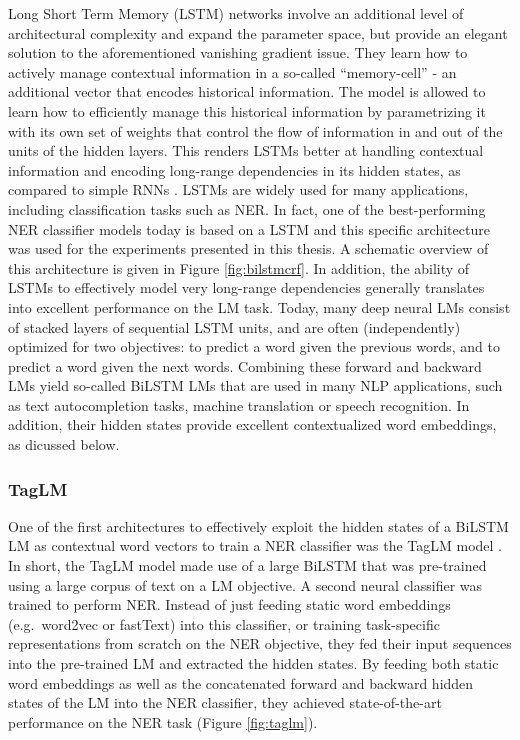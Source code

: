 \documentclass[12pt,a4paper,]{book}
\begin{document}
Long Short Term Memory (LSTM) networks involve an additional level of architectural complexity and expand the parameter space, but provide an elegant solution to the aforementioned vanishing gradient issue. They learn how to actively manage contextual information in a so-called ``memory-cell'' - an additional vector that encodes historical information. The model is allowed to learn how to efficiently manage this historical information by parametrizing it with its own set of weights that control the flow of information in and out of the units of the hidden layers. This renders LSTMs better at handling contextual information and encoding long-range dependencies in its hidden states, as compared to simple RNNs \citep{goodfellow2016}. LSTMs are widely used for many applications, including classification tasks such as NER. In fact, one of the best-performing NER classifier models today is based on a LSTM and this specific architecture was used for the experiments presented in this thesis. A schematic overview of this architecture is given in Figure \ref{fig:bilstmcrf}. In addition, the ability of LSTMs to effectively model very long-range dependencies generally translates into excellent performance on the LM task. Today, many deep neural LMs consist of stacked layers of sequential LSTM units, and are often (independently) optimized for two objectives: to predict a word given the previous words, and to predict a word given the next words. Combining these forward and backward LMs yield so-called BiLSTM LMs that are used in many NLP applications, such as text autocompletion tasks, machine translation or speech recognition. In addition, their hidden states provide excellent contextualized word embeddings, as dicussed below.

\hypertarget{taglm}{%
\subsubsection{TagLM}\label{taglm}}

One of the first architectures to effectively exploit the hidden states of a BiLSTM LM as contextual word vectors to train a NER classifier was the TagLM model \citep{peters2017}. In short, the TagLM model made use of a large BiLSTM that was pre-trained using a large corpus of text on a LM objective. A second neural classifier was trained to perform NER. Instead of just feeding static word embeddings (e.g.~word2vec or fastText) into this classifier, or training task-specific representations from scratch on the NER objective, they fed their input sequences into the pre-trained LM and extracted the hidden states. By feeding both static word embeddings as well as the concatenated forward and backward hidden states of the LM into the NER classifier, they achieved state-of-the-art performance on the NER task (Figure \ref{fig:taglm}).
\end{document}
